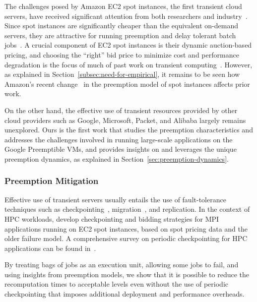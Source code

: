 The challenges posed by Amazon EC2 spot instances, the first transient cloud servers, have received significant attention from both researchers and industry~\cite{spotinst}.
Since spot instances are significantly cheaper than the equivalent on-demand servers, they are attractive for running preemption and delay tolerant batch jobs~\cite{spoton, jain14demand, yi2010reducing, conductor, liu-spot, spot-run, dubois2016optispot}.
A crucial component of EC2 spot instances is their dynamic auction-based pricing, and choosing the ``right'' bid price to minimize cost and performance degradation is the focus of much of past work on transient computing~\cite{bidding4,mihailescu2012impact,bidding7,bidding1,bidding8,bidding3,bidding6,bid-cloud,bidding5,wolski_probabilistic_2017, guo_bidding_2015}.
However, as explained in Section~\ref{subsec:need-for-empirical}, it remains to be seen how Amazon's recent change~\cite{} in the preemption model of spot instances affects prior work.


On the other hand, the effective use of transient resources provided by other cloud providers such as Google, Microsoft, Packet, and Alibaba largely remains unexplored. 
Ours is the first work that studies the preemption characteristics and addresses the challenges involved in running large-scale applications on the Google Preemptible VMs, and provides insights on and leverages the unique preemption dynamics, as explained in Section~\ref{sec:preemption-dynamics}.


\subsubsection{Preemption Mitigation}
Effective use of transient servers usually entails the use of fault-tolerance techniques such as checkpointing~\cite{flint}, migration~\cite{spotcheck}, and replication.
In the context of HPC workloads,\cite{marathe2014exploiting,gong_monetary_2015,xiang_spotmpi:_2011} develop checkpointing and bidding strategies for MPI applications running on EC2 spot instances, based on spot pricing data and the older failure model.
A comprehensive survey on periodic checkpointing for HPC applications can be found in~\cite{dongarra_fault_nodate}. 

By treating bags of jobs as an execution unit, allowing some jobs to fail, and using insights from preemption models, we show that it is possible to reduce the recomputation times to acceptable levels even without the  use of periodic  checkpointing that imposes additional deployment and performance overheads.

